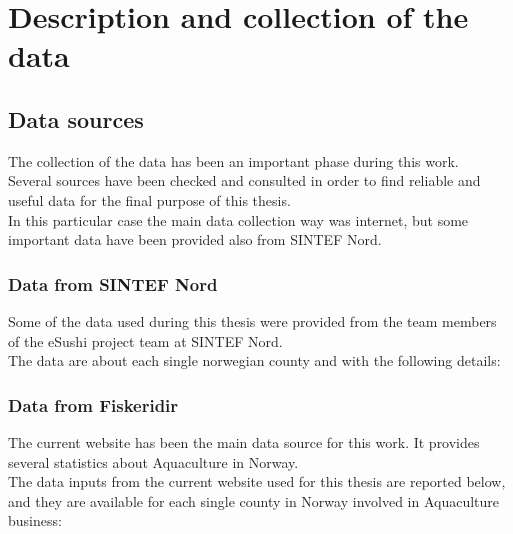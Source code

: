 
\newpage
\chapter{Description and collection of the data}
\section{Data sources}
The collection of the data has been an important phase during this work. \\
Several sources have been checked and consulted in order to find reliable and useful data for the final purpose of this thesis.\\
In this particular case the main data collection way was internet, but some important data have been provided also from SINTEF Nord.


\subsection{Data from SINTEF Nord}
Some of the data used during this thesis were provided from the team members of the eSushi project team at SINTEF Nord. \\
The data are about each single norwegian county and with the following details:\\





\newpage
 
\subsection{Data from Fiskeridir} 
The current website has been the main data source for this work. It provides several statistics about Aquaculture in Norway.\\
The data inputs from the current website used for this thesis are reported below, and they are available for each single county in Norway involved in Aquaculture business:


